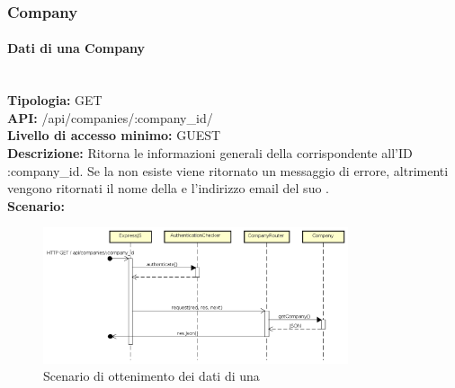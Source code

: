 \newpage
\subsubsection{Company}
\paragraph{Dati di una Company}\mbox{}\\
\textbf{Tipologia:} GET \\
\textbf{API:} /api/companies/:company\_id/ \\
\textbf{Livello di accesso minimo:} GUEST \\
\textbf{Descrizione:} Ritorna le informazioni generali della  corrispondente all'ID :company\_id. Se la  non esiste viene ritornato un messaggio di errore, altrimenti vengono ritornati il nome della  e l'indirizzo email del suo . \\
\textbf{Scenario:} 
\begin{figure}[H]
\centering
\includegraphics[width=0.8\textwidth]{res/sections/backend/sequence/(GET)company.png}
\caption{Scenario di ottenimento dei dati di una }
\end{figure}

\newpage
